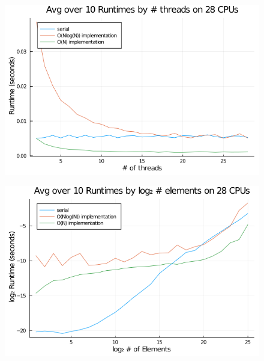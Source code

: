 \documentclass{article}
\begin{document}
\begin{figure}[h]
  \caption{}
  \includegraphics[scale=.45]{hw2_threads.png}
\end{figure}

\begin{figure}[h]
  \caption{}
\includegraphics[scale=.45]{hw2_length.png}
\end{figure}
\end{document}
